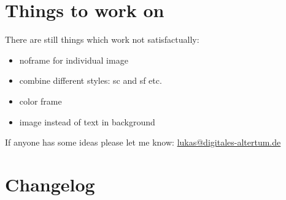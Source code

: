 \documentclass[a4paper,
10pt,
english
]{ltxdoc}
\begin{document}
\clearpage
\section{Things to work on}
There are still things which work not satisfactually:
\begin{itemize}
	\item  noframe for individual image
\item  combine different styles: sc and sf etc.
\item  color frame
\item  image instead of text in background
\end{itemize}
If anyone has some ideas please let me know: \href{mailto:lukas@digitales-altertum.de}{lukas@digitales-altertum.de}

\section{Changelog}
\PrintRevisions
\end{document}
